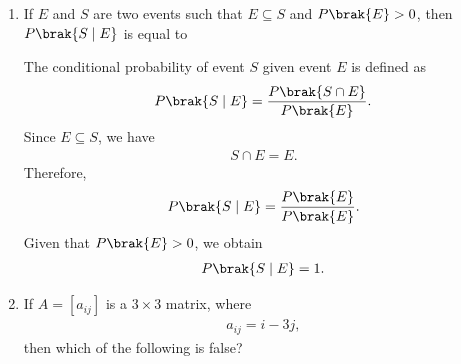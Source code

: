 \begin{enumerate}[label=\thesubsection.\arabic*, ref=\thesubsection.\theenumi]
Therefore, the correct answer is

\begin{align}
\text{Option \brak{D}: Feasible region}
\end{align}

\item
If $E$ and $S$ are two events such that $E\subseteq S$
and $P\brak{E}>0$, then $P\brak{S\mid E}$ is equal to

\begin{enumerate}
\end{enumerate}

\solution
The conditional probability of event $S$ given event $E$
is defined as
\begin{align}
P\brak{S\mid E}=\frac{P\brak{S\cap E}}{P\brak{E}}.
\end{align}
Since $E\subseteq S$, we have
\begin{align}
S\cap E=E.
\end{align}
Therefore,
\begin{align}
P\brak{S\mid E}=\frac{P\brak{E}}{P\brak{E}}.
\end{align}
Given that $P\brak{E}>0$, we obtain
\begin{align}
P\brak{S\mid E}=1.
\end{align}


\item
If $A = [a_{ij}]$ is a $3 \times 3$ matrix, where
\begin{align}
a_{ij} = i - 3j,
\end{align}
then which of the following is false?

\begin{enumerate}
\end{enumerate}


\end{enumerate}
